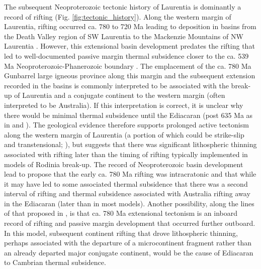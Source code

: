 \documentclass[11pt,letterpaper]{article}
\begin{document}
The subsequent Neoproterozoic tectonic history of Laurentia is dominantly a record of rifting (Fig. \ref{fig:tectonic_history}). Along the western margin of Laurentia, rifting occurred ca. 780 to 720 Ma leading to deposition in basins from the Death Valley region of SW Laurentia to the Mackenzie Mountains of NW Laurentia \citep{Macdonald2013a, Dehler2017a, Rooney2017a}. However, this extensional basin development predates the rifting that led to well-documented passive margin thermal subsidence closer to the ca. 539 Ma Neoproterozoic-Phanerozoic boundary \citep{Bond1984a, Levy1991a}. The emplacement of the ca. 780 Ma Gunbarrel large igneous province along this margin and the subsequent extension recorded in the basins is commonly interpreted to be associated with the break-up of Laurentia and a conjugate continent to the western margin (often interpreted to be Australia). If this interpretation is correct, it is unclear why there would be minimal thermal subsidence until the Ediacaran (post 635 Ma as in \citealp{Levy1991a} and \citealp{Witkosky2018a}). The geological evidence therefore supports prolonged active tectonism along the western margin of Laurentia (a portion of which could be strike-slip and transtensional; \citealp{Smith2015b}), but suggests that there was significant lithospheric thinning associated with rifting later than the timing of rifting typically implemented in models of Rodinia break-up. The record of Neoproterozoic basin development lead \cite{Yonkee2014a} to propose that the early ca. 780 Ma rifting was intracratonic and that while it may have led to some associated thermal subsidence that there was a second interval of rifting and thermal subsidence associated with Australia rifting away in the Ediacaran (later than in most models). Another possibility, along the lines of that proposed in \citet{Ross1991a}, is that ca. 780 Ma extensional tectonism is an inboard record of rifting and passive margin development that occurred further outboard. In this model, subsequent continent rifting that drove lithospheric thinning, perhaps associated with the departure of a microcontinent fragment rather than an already departed major conjugate continent, would be the cause of Ediacaran to Cambrian thermal subsidence.
\end{document}
